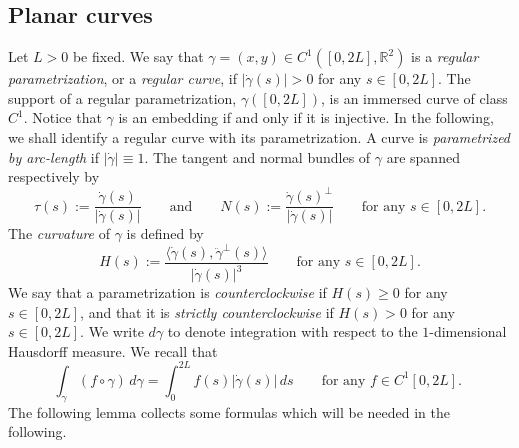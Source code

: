 \documentclass[11pt]{amsart}
\renewcommand{\geq}{\geqslant}
\newcommand{\rr}{{\mathbb{R}}}
\theoremstyle{definition}
\theoremstyle{remark}
\numberwithin{equation}{section}
\begin{document}
	\subsection{Planar curves}\label{subsec_Planarcurves}
	Let $L>0$ be fixed. We say that $\gamma=(x,y)\in C^1\left([0,2L],\rr^2\right)$ is a \emph{regular parametrization}, or a \emph{regular curve}, if $|\dot\gamma(s)|>0$ for any $s\in[0,2L]$. The support of a regular parametrization, $\gamma([0,2L])$, is an immersed curve of class $C^1$. Notice that $\gamma$ is an embedding if and only if it is injective. In the following, we shall identify a regular curve with its parametrization. A curve is \emph{parametrized by arc-length} if $|\dot\gamma|\equiv 1$. The tangent and normal bundles of $\gamma$ are spanned respectively by
	\begin{equation}\label{tangennnormmmm}
		\tau(s):=\frac{\dot\gamma(s)}{|\dot\gamma(s)|}\qquad\text{and}\qquad N(s):=\frac{\dot\gamma(s)^\perp}{|\dot\gamma(s)|}\qquad\text{for any $s\in[0,2L]$.}
	\end{equation}
	The \emph{curvature} of $\gamma$ is defined by
	\begin{equation*}  H(s):=\frac{\big\langle\dot\gamma(s),\ddot\gamma^\perp(s)\big\rangle}{|\dot\gamma(s)|^3}\qquad\text{for any $s\in[0,2L]$.}
	\end{equation*}
	We say that a parametrization is \emph{counterclockwise} if $H(s)\geq 0$ for any $s\in [0,2L]$, and that it is \emph{strictly counterclockwise} if $H(s)> 0$ for any $s\in [0,2L]$. We write $d\gamma$ to denote integration with respect to the $1$-dimensional Hausdorff measure. We recall that
	\begin{equation}\label{ibpformula}
		\int_\gamma \left(f\circ\gamma\right)\,d\gamma=\int_0^{2L}f(s)|\dot\gamma(s)|\,ds\qquad\text{for any $f\in C^1[0,2L]$. }
	\end{equation}
	The following lemma collects some formulas which will be needed in the following. 
\end{document}
